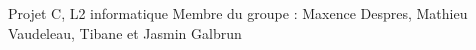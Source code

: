 Projet C, L2 informatique Membre du groupe \+: Maxence Despres, Mathieu Vaudeleau, Tibane et Jasmin Galbrun 